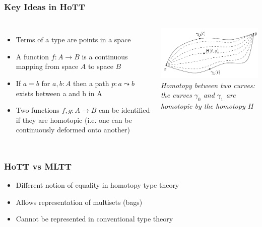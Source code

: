 \documentclass{beamer}
\begin{document}
\begin{frame}
\frametitle{Key Ideas in HoTT}
\begin{columns}[c]

\begin{itemize}
\item Terms of a type are points in a space
\item A function $ f : A \to B $ is a continuous mapping from space $ A $ to space $ B $
\item If $a = b$ for $a,b : A$ then a path $ p : a \leadsto b $ exists between a and b in A
\item Two functions $ f,g : A \to B $ can be identified if they are homotopic (i.e. one can be continuously deformed onto another)
\end{itemize}

\includegraphics[scale=0.3]{./2.png}\\
\small{\textit{Homotopy between two curves: the curves $\gamma_0$ and $ \gamma_1$ are homotopic by the homotopy $H$}}


\end{columns}
\end{frame}


\begin{frame}
\frametitle{HoTT vs MLTT}

\begin{itemize}
\item Different notion of equality in homotopy type theory
\item Allows representation of multisets (bags)
\item Cannot be represented in conventional type theory 
\end{itemize}
\end{frame}
\end{document}
